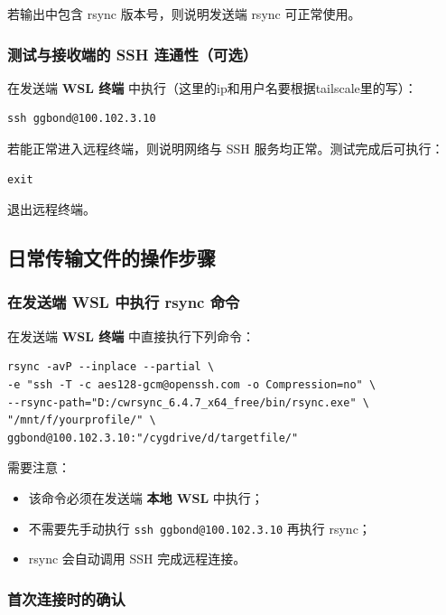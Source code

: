 \documentclass[UTF8]{ctexart}
\begin{document}
若输出中包含 rsync 版本号，则说明发送端 rsync 可正常使用。

\subsubsection{测试与接收端的 SSH 连通性（可选）}

在发送端 \textbf{WSL 终端} 中执行（这里的ip和用户名要根据tailscale里的写）：

\begin{lstlisting}
ssh ggbond@100.102.3.10
\end{lstlisting}

若能正常进入远程终端，则说明网络与 SSH 服务均正常。测试完成后可执行：

\begin{lstlisting}
exit
\end{lstlisting}

退出远程终端。

\subsection{日常传输文件的操作步骤}

\subsubsection{在发送端 WSL 中执行 rsync 命令}

在发送端 \textbf{WSL 终端} 中直接执行下列命令：

\begin{lstlisting}
rsync -avP --inplace --partial \
-e "ssh -T -c aes128-gcm@openssh.com -o Compression=no" \
--rsync-path="D:/cwrsync_6.4.7_x64_free/bin/rsync.exe" \
"/mnt/f/yourprofile/" \
ggbond@100.102.3.10:"/cygdrive/d/targetfile/"
\end{lstlisting}

需要注意：

\begin{itemize}
    \item 该命令必须在发送端 \textbf{本地 WSL} 中执行；
    \item 不需要先手动执行 \texttt{ssh ggbond@100.102.3.10} 再执行 rsync；
    \item rsync 会自动调用 SSH 完成远程连接。
\end{itemize}

\subsubsection{首次连接时的确认}
\end{document}
